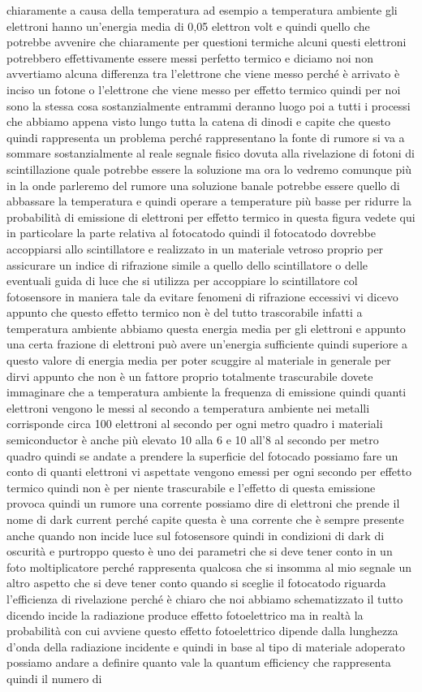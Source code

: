 chiaramente a causa della temperatura ad esempio a temperatura ambiente gli elettroni hanno un'energia media di 0,05 elettron volt e quindi quello che potrebbe avvenire che chiaramente per questioni termiche alcuni questi elettroni potrebbero effettivamente essere messi perfetto termico e diciamo noi non avvertiamo alcuna differenza tra l'elettrone che viene messo perché è arrivato è inciso un fotone o l'elettrone che viene messo per effetto termico quindi per noi sono la stessa cosa sostanzialmente entrammi deranno luogo poi a tutti i processi che abbiamo appena visto lungo tutta la catena di dinodi e capite che questo quindi rappresenta un problema perché rappresentano la fonte di rumore si va a sommare sostanzialmente al reale segnale fisico dovuta alla rivelazione di fotoni di scintillazione quale potrebbe essere la soluzione ma ora lo vedremo comunque più in la onde parleremo del rumore una soluzione banale potrebbe essere quello di abbassare la temperatura e quindi operare a temperature più basse per ridurre la probabilità di emissione di elettroni per effetto termico in questa figura vedete qui in particolare la parte relativa al fotocatodo quindi il fotocatodo dovrebbe accoppiarsi allo scintillatore e realizzato in un materiale vetroso proprio per assicurare un indice di rifrazione simile a quello dello scintillatore o delle eventuali guida di luce che si utilizza per accoppiare lo scintillatore col fotosensore in maniera tale da evitare fenomeni di rifrazione eccessivi vi dicevo appunto che questo effetto termico non è del tutto trascorabile infatti a temperatura ambiente abbiamo questa energia media per gli elettroni e appunto una certa frazione di elettroni può avere un'energia sufficiente quindi superiore a questo valore di energia media per poter scuggire al materiale in generale per dirvi appunto che non è un fattore proprio totalmente trascurabile dovete immaginare che a temperatura ambiente la frequenza di emissione quindi quanti elettroni vengono le messi al secondo a temperatura ambiente nei metalli corrisponde circa 100 elettroni al secondo per ogni metro quadro i materiali semiconductor è anche più elevato 10 alla 6 e 10 all'8 al secondo per metro quadro quindi se andate a prendere la superficie del fotocado possiamo fare un conto di quanti elettroni vi aspettate vengono emessi per ogni secondo per effetto termico quindi non è per niente trascurabile e l'effetto di questa emissione provoca quindi un rumore una corrente possiamo dire di elettroni che prende il nome di dark current perché capite questa è una corrente che è sempre presente anche quando non incide luce sul fotosensore quindi in condizioni di dark di oscurità e purtroppo questo è uno dei parametri che si deve tener conto in un foto moltiplicatore perché rappresenta qualcosa che si insomma al mio segnale un altro aspetto che si deve tener conto quando si sceglie il fotocatodo riguarda l'efficienza di rivelazione perché è chiaro che noi abbiamo schematizzato il tutto dicendo incide la radiazione produce effetto fotoelettrico ma in realtà la probabilità con cui avviene questo effetto fotoelettrico dipende dalla lunghezza d'onda della radiazione incidente e quindi in base al tipo di materiale adoperato possiamo andare a definire quanto vale la quantum efficiency che rappresenta quindi il numero di 